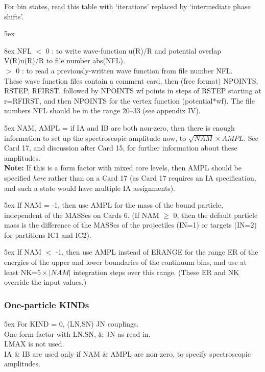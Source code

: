 \documentclass[11pt]{article}
\begin{document}
For bin states, read this table with `iterations' replaced by `intermediate
phase shifts'.

\hangindent 5ex

\hangindent 8ex  NFL
      $<$ 0    : to write wave-function u(R)/R and potential overlap
V(R)u(R)/R to file number abs(NFL).
\\  $>$ 0 : to read a previously-written wave function from file number
NFL.
\\ These wave function files contain a comment card,
then (free format) NPOINTS, RSTEP, RFIRST,
followed by NPOINTS wf points in steps of RSTEP starting at r=RFIRST,
and then NPOINTS for the vertex function (potential*wf).
The file numbers NFL should be in the range 20--33 (see appendix IV).



\hangindent 5ex
NAM, AMPL = if IA and IB are both non-zero, then there is enough
information to set up the spectroscopic amplitude now,
to  $\sqrt{NAM} \times AMPL$.
See Card 17, and discussion after Card 15, for further information
about these amplitudes.\\
{\bf Note:} If this is a form factor with mixed core levels,
then AMPL should be specified {\em here} rather than on a Card 17
(as Card 17 requires an IA specification, and such a state would
have multiple IA assignments).

\hangindent 5ex
If NAM = -1, then use AMPL for the mass of the bound particle,
independent of the MASSes on Cards 6.
(If NAM $\geq$ 0, then the default particle mass is the difference of
the MASSes of the projectiles (IN=1) or targets (IN=2) for partitions
IC1 and IC2).

\hangindent 5ex
If NAM $<$ -1, then use AMPL instead of ERANGE for the range ER of the
energies of the upper
and lower boundaries of the continuum bins, and use at least
NK=$5\times|NAM|$ integration steps over this range.
(These ER and NK override the input values.)
\subsubsection{One-particle KINDs}
\bigskip

\hangindent 5ex
For KIND = 0,   (LN,SN) JN couplings.
\\
One form factor with LN,SN, \& JN as read in.
\\
LMAX is not used.
\\
IA \& IB are used only if NAM \& AMPL are non-zero, to specify
spectroscopic amplitudes.
\bigskip
\end{document}
